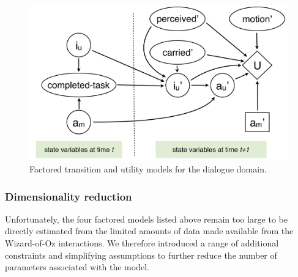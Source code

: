 \begin{figure}[ht]
\centering
\includegraphics[scale=0.4]{imgs/unstructuredmodel.pdf} 
\caption{Factored transition and utility models for the dialogue domain.}
\label{fig:unstructuredmodel-exp3}
\end{figure}

\subsubsection*{Dimensionality reduction}


Unfortunately, the four factored models listed above remain too large to be directly estimated from the limited amounts of data made available from the Wizard-of-Oz interactions.  We therefore introduced a range of additional constraints and simplifying assumptions to further reduce the number of parameters associated with the model.


